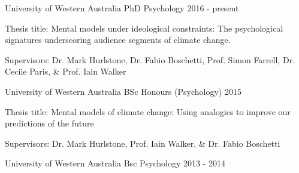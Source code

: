 

\begin{cventries}

  \cventry
    {University of Western Australia} %
    {PhD Psychology} %
    {}%
    {2016 - present} %
    {
      \begin{cvitems} %
        \item {Thesis title: Mental models under ideological constraints: The psychological signatures underscoring audience segments of climate change.}
        \item {Supervisors: Dr. Mark Hurlstone, Dr. Fabio Boschetti, Prof. Simon Farrell, Dr. Cecile Paris, \& Prof. Iain Walker}
      \end{cvitems}
    }

  \cventry
    {University of Western Australia} %
    {BSc Honours (Psychology)} %
    {} %
    {2015} %
    {
      \begin{cvitems} %
        \item {Thesis title: Mental models of climate change: Using analogies to improve our predictions of the future}
        \item {Supervisors: Dr. Mark Hurlstone, Prof. Iain Walker, \& Dr. Fabio Boschetti}
      \end{cvitems}
    }

  \cventry
    {University of Western Australia} %
    {Bsc Psychology} %
    {} %
    {2013 - 2014} %
    {}

\end{cventries}
